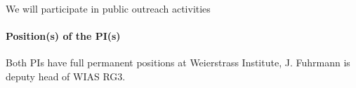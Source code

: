 \documentclass[a4paper,10pt]{article}
\begin{document}
We will participate in public outreach activities

\paragraph{Position(s) of the PI(s)}
Both PIs have full permanent positions at Weierstrass Institute, J. Fuhrmann is deputy head of WIAS RG3.
\end{document}
